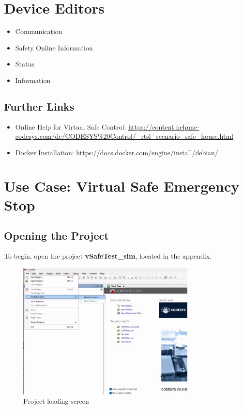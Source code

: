 \documentclass[a4paper,12pt]{article}
\begin{document}
\section{Device Editors}
\begin{itemize}
	\item Communication
	\item Safety Online Information
	\item Status
	\item Information
\end{itemize}

\subsection{Further Links}
\begin{itemize}
	\item Online Help for Virtual Safe Control: \url{https://content.helpme-codesys.com/de/CODESYS%20Control/_rtsl_scenario_safe_house.html}
	\item Docker Installation: \url{https://docs.docker.com/engine/install/debian/}
\end{itemize}

\newpage

\section{Use Case: Virtual Safe Emergency Stop}

\subsection{Opening the Project}

To begin, open the project \textbf{vSafeTest\_sim}, located in the appendix.

\begin{figure}[H]
	\centering
	\includegraphics[width=0.8\textwidth]{c1.JPG}
	\caption{Project loading screen}
\end{figure}
\end{document}
